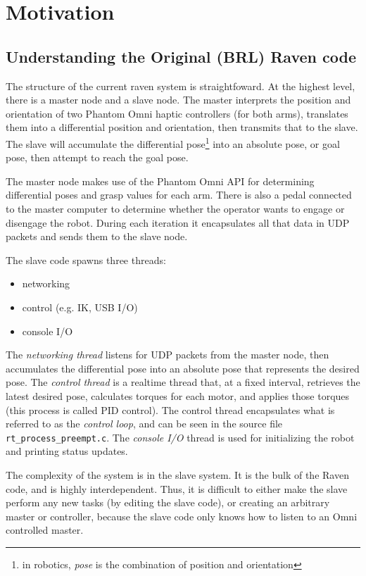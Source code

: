 \documentclass[letterpaper,twocolumn,10pt]{article}
\begin{document}
\section{Motivation}

\subsection{Understanding the Original (BRL) Raven code}

The structure of the current raven system is straightfoward. At the
highest level, there is a master node and a slave node. The master
interprets the position and orientation of two Phantom Omni haptic
controllers (for both arms), translates them into a differential
position and orientation, then transmits that to the slave. The slave
will accumulate the differential pose\footnote{in robotics, \emph{pose}
  is the combination of position and orientation} into an absolute
pose, or goal pose, then attempt to reach the goal pose.

The master node makes use of the Phantom Omni API for determining
differential poses and grasp values for each arm. There is also a
pedal connected to the master computer to determine whether the
operator wants to engage or disengage the robot. During each iteration
it encapsulates all that data in UDP packets and sends them to the
slave node.

\vspace{0.5em}
\noindent
The slave code spawns three threads:
\begin{itemize}[noitemsep]
  \item networking
  \item control (e.g. IK, USB I/O)
  \item console I/O
\end{itemize}

The \emph{networking thread} listens for UDP packets from the master
node, then accumulates the differential pose into an absolute pose
that represents the desired pose. The \emph{control thread} is a
realtime thread that, at a fixed interval, retrieves the latest
desired pose, calculates torques for each motor, and applies those
torques (this process is called PID control). The control thread
encapsulates what is referred to as the \emph{control loop}, and can
be seen in the source file \texttt{rt\_process\_preempt.c}. The
\emph{console I/O} thread is used for initializing the robot and
printing status updates.

The complexity of the system is in the slave system. It is the bulk 
of the Raven code, and is highly interdependent. Thus, it is difficult 
to either make the slave perform any new tasks (by editing the slave 
code), or creating an arbitrary master or controller, because the 
slave code only knows how to listen to an Omni controlled master.
\end{document}
